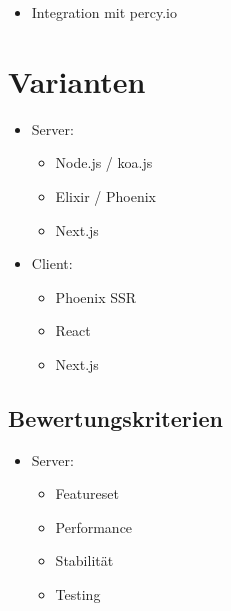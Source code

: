 \begin{itemize}
  \tightlist
  \item
        Integration mit percy.io
\end{itemize}

\section{Varianten}\label{varianten}

\begin{itemize}
  \tightlist
  \item
        Server:
        \begin{itemize}
          \tightlist
          \item
                Node.js / koa.js
          \item
                Elixir / Phoenix
          \item
                Next.js
        \end{itemize}
\end{itemize}

\begin{itemize}
  \tightlist
  \item
        Client:
        \begin{itemize}
          \tightlist
          \item
                Phoenix SSR
          \item
                React
          \item
                Next.js
        \end{itemize}
\end{itemize}

\subsection{Bewertungskriterien}\label{bewertungskriterien}

\begin{itemize}
  \tightlist
  \item
        Server:
        \begin{itemize}
          \tightlist
          \item
                Featureset
          \item
                Performance
          \item
                Stabilität
          \item
                Testing
        \end{itemize}
\end{itemize}

